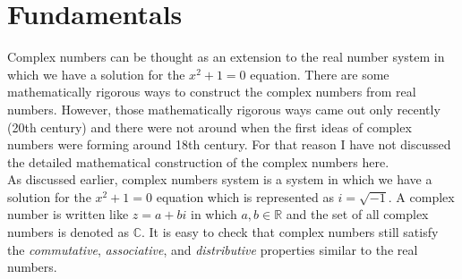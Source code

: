 \section{Fundamentals}

Complex numbers can be thought as an extension to the real number system in which we have a solution for the $x^2 +1 = 0 $ equation. There are some mathematically rigorous ways to construct the complex numbers from real numbers. However, those mathematically rigorous ways came out only recently (20th century) and there were not around when the first ideas of complex numbers were forming around 18th century.  For that reason I have not discussed the detailed mathematical construction of the complex numbers here. \\

As discussed earlier, complex numbers system is a system in which we have a solution for the $x^2+1=0$ equation which is represented as $i = \sqrt{-1}$. A complex number is written like $z = a+bi$ in which $a,b \in \mathbb{R}$ and the set of all complex numbers is denoted as $\mathbb{C}$. It is easy to check that complex numbers still satisfy the \emph{commutative}, \emph{associative}, and \emph{distributive} properties similar to the real numbers. \\

